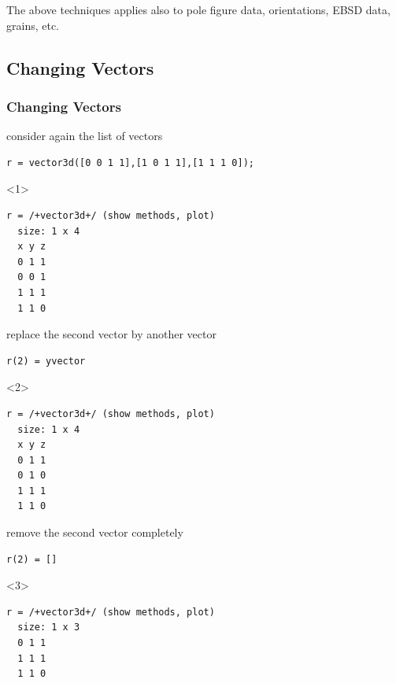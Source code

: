 \documentclass[compress]{beamer}
\begin{document}
\begin{frame}[fragile]
\begin{overlayarea}{\textwidth}{8cm}
    \pause \medskip

    \alert{The above techniques applies also to pole figure data,
    orientations, EBSD data, grains, etc.}
  \end{overlayarea}
\end{frame}


\subsection*{Changing Vectors}

\begin{frame}[fragile]
  \frametitle{Changing Vectors}

  \begin{overlayarea}{\textwidth}{8cm}

    consider again the list of vectors
    \begin{lstlisting}[style=input]
r = vector3d([0 0 1 1],[1 0 1 1],[1 1 1 0]);
    \end{lstlisting}

    \begin{onlyenv}<1>
      \vspace{-0.3cm}
      \begin{lstlisting}[style=output]
r = /+vector3d+/ (show methods, plot)
  size: 1 x 4
  x y z
  0 1 1
  0 0 1
  1 1 1
  1 1 0
      \end{lstlisting}
    \end{onlyenv}

    \pause \medskip

    replace the second vector by another vector
    \begin{lstlisting}[style=input]
r(2) = yvector
    \end{lstlisting}

    \begin{onlyenv}<2>
      \vspace{-0.3cm}
      \begin{lstlisting}[style=output]
r = /+vector3d+/ (show methods, plot)
  size: 1 x 4
  x y z
  0 1 1
  0 1 0
  1 1 1
  1 1 0
      \end{lstlisting}
    \end{onlyenv}

    \pause \medskip

    remove the second vector completely
    \begin{lstlisting}[style=input]
r(2) = []
    \end{lstlisting}
    \begin{onlyenv}<3>
      \vspace{-0.3cm}
      \begin{lstlisting}[style=output]
r = /+vector3d+/ (show methods, plot)
  size: 1 x 3
  0 1 1
  1 1 1
  1 1 0
      \end{lstlisting}
    \end{onlyenv}


\end{overlayarea}
\end{frame}
\end{document}
